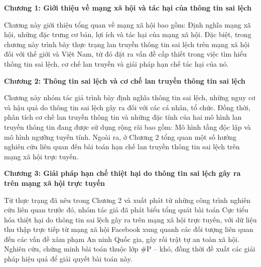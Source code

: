 {\bfseries Chương 1: Giới thiệu về mạng xã hội và tác hại của thông tin sai lệch}

Chương này giới thiệu tổng quan về mạng xã hội bao gồm: Định nghĩa mạng xã hội, những đặc trưng cơ bản, lợi ích và tác hại của mạng xã hội. Đặc biệt, trong chương này trình bày thực trạng lan truyền thông tin sai lệch trên mạng xã hội đối với thế giới và Việt Nam, từ đó đặt ra vấn đề cấp thiết trong việc tìm hiểu thông tin sai lệch, cơ chế lan truyền và giải pháp hạn chế tác hại của nó.

{\bfseries Chương 2: Thông tin sai lệch và cơ chế lan truyền thông tin sai lệch}

Chương này nhóm tác giả trình bày định nghĩa thông tin sai lệch, những nguy cơ và hậu quả do thông tin sai lệch gây ra đối với các cá nhân, tổ chức. Đồng thời, phân tích cơ chế lan truyền thông tin và những đặc tính của hai mô hình lan truyền thông tin đang được sử dụng rộng rãi bao gồm: Mô hình tầng độc lập và mô hình ngưỡng tuyến tính. Ngoài ra, ở Chương 2 tổng quan một số hướng nghiên cứu liên quan đến bài toán hạn chế lan truyền thông tin sai lệch trên mạng xã hội trực tuyến.

{\bfseries Chương 3: Giải pháp hạn chế thiệt hại do thông tin sai lệch gây ra trên mạng xã hội trực tuyến}

Từ thực trạng đã nêu trong Chương 2 và xuất phát từ những công trình nghiên cứu liên quan trước đó, nhóm tác giả đã phát biểu tổng quát bài toán Cực tiểu hóa thiệt hại do thông tin sai lệch gây ra trên mạng xã hội trực tuyến, với dữ liệu thu thập trực tiếp từ mạng xã hội Facebook xung quanh các đối tượng liên quan đến các vấn đề xâm phạm An ninh Quốc gia, gây rối trật tự an toàn xã hội. Nghiên cứu, chứng minh bài toán thuộc lớp \#P – khó, đồng thời đề xuất các giải pháp hiệu quả để giải quyết bài toán này.